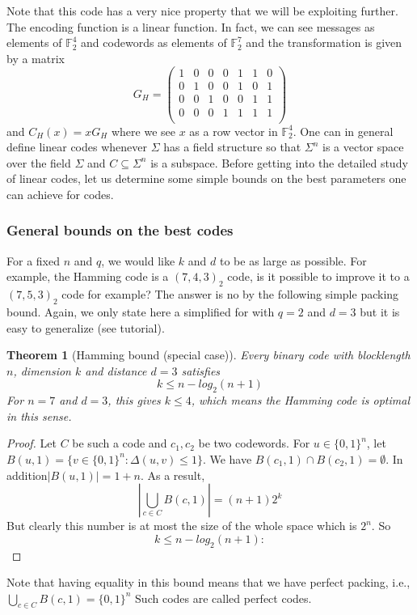 \documentclass{article}
\newtheorem{thm}{Theorem}
\begin{document}
Note that this code has a very nice property that we will be exploiting further. The encoding
function is a linear function. In fact, we can see messages as elements of $\mathbb{F}^4_2$
and codewords as elements of $\mathbb{F}^7_2$ and the transformation is given by a matrix
\[
G_H = \left(
\begin{matrix}
1& 0& 0& 0& 1& 1& 0\\
0& 1& 0& 0& 1& 0& 1\\
0& 0& 1& 0& 0& 1& 1\\
0& 0& 0& 1& 1& 1& 1\\
\end{matrix}
\right)
\]
and $C_H(x) = xG_H$ where we see $x$ as a row vector in $\mathbb{F}^4_2$. One can in general define linear codes
whenever $\Sigma$ has a field structure so that $\Sigma^n$ is a vector space over the field $\Sigma$ and $C \subseteq \Sigma^n$ is a subspace. Before getting into the detailed study of linear codes, let us determine some simple bounds on the best parameters one can achieve for codes.

\subsubsection{General bounds on the best codes}
For a fixed $n$ and $q$, we would like $k$ and $d$ to be as large as possible. For example, the Hamming code is a $(7, 4, 3)_2$ code, is it possible to improve it to a $(7, 5, 3)_2$ code for example? The answer is no by the following simple packing bound. Again, we only state here a simplified for with $q = 2$ and $d = 3$ but it is easy to generalize (see tutorial).

\begin{thm}[Hamming bound (special case)]
Every binary code with blocklength $n$, dimension
$k$ and distance $d = 3$ satisfies
\[
k \leq n - log_2(n + 1)
\]
For $n = 7$ and $d = 3$, this gives $k \leq 4$, which means the Hamming code is optimal in this sense.
\end{thm}

\begin{proof}
Let $C$ be such a code and $c_1, c_2$ be two codewords. For $u \in \{0, 1\}^n$, let $B(u, 1) = \{v \in \{0, 1\}^n : \Delta (u, v) \leq 1 \}$. We have $B(c_1, 1) \cap B(c_2, 1) = \emptyset$. In addition$|B(u, 1)| = 1 + n$. As a result,
\[
| \bigcup\limits_{c\in C} B(c, 1)| = (n + 1)2^k
\]
But clearly this number is at most the size of the whole space which is $2^n$. So
\[
k \leq n - log_2(n + 1) :
\]
\end{proof}
Note that having equality in this bound means that we have perfect packing, i.e., $\bigcup_{c\in C} B(c, 1) = \{0, 1\}^n $
Such codes are called perfect codes.
\end{document}
